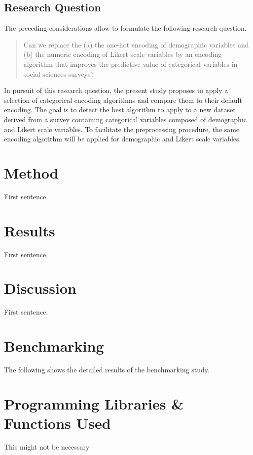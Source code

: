 \documentclass[letterpaper]{article} %
\begin{document}
\subsection{Research Question}
The preceding considerations allow to formulate the following research question.
\begin{quotation}
    Can we replace the (a) the one-hot encoding of demographic variables and (b) the numeric encoding of Likert scale variables by an encoding algorithm  that improves the predictive value of categorical variables in social sciences surveys?
\end{quotation}
In pursuit of this research question, the present study proposes to apply a selection of categorical encoding algorithms and compare them to their default encoding. The goal is to detect the best algorithm to apply to a new dataset derived from a survey containing categorical variables composed of demographic and Likert scale variables. To facilitate the preprocessing procedure, the same encoding algorithm will be applied for demographic and Likert scale variables.

\section{Method}
\noindent First sentence.

\section{Results}
\noindent First sentence.

\section{Discussion}
\noindent First sentence.





\appendix

\section{Benchmarking}\label{apd:first}
The following shows the detailed results of the benchmarking study.

\section{Programming Libraries \& Functions Used}\label{apd:second}
This might not be necessary
\end{document}
